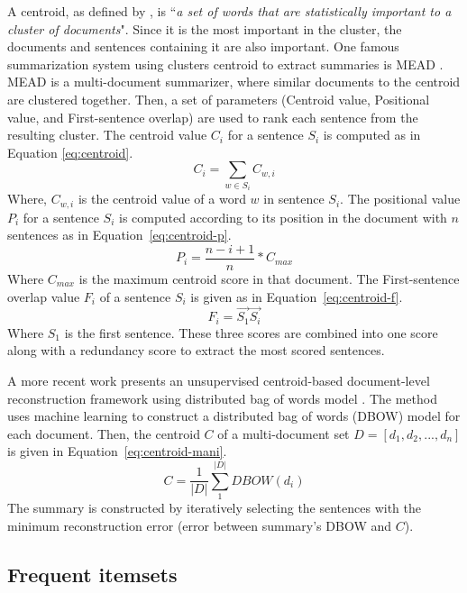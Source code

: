 A centroid, as defined by \citet{04-radev-al}, is ``\textit{a set of words that are statistically important to a cluster of documents}". 
Since it is the most important in the cluster, the documents and sentences containing it are also important.
One famous summarization system using clusters centroid to extract summaries is MEAD \citep{00-radev-al,04-radev-al}.
MEAD is a multi-document summarizer, where similar documents to the centroid are clustered together.
Then, a set of parameters (Centroid value, Positional value, and First-sentence overlap) are used to rank each sentence from the resulting cluster.
The centroid value $ C_i $ for a sentence $ S_i $ is computed as in Equation \ref{eq:centroid}.
\begin{equation}
\label{eq:centroid}
C_i = \sum_{w \in S_i}  C_{w,i}
\end{equation}
Where, $ C_{w,i} $ is the centroid value of a word $ w $ in sentence $ S_i $.
The positional value $ P_i $ for a sentence $ S_i $ is computed according to its position in the document with $ n $ sentences as in Equation~\ref{eq:centroid-p}.
\begin{equation}
\label{eq:centroid-p}
P_i = \frac{n - i + 1}{n} * C_{max}
\end{equation}
Where $ C_{max} $ is the maximum centroid score in that document.
The First-sentence overlap value $ F_i $ of a sentence $ S_i $ is given as in Equation~\ref{eq:centroid-f}.
\begin{equation}
\label{eq:centroid-f}
F_i = \overrightarrow{S_1} \overrightarrow{S_i}
\end{equation}
Where $ S_1 $ is the first sentence.
These three scores are combined into one score along with a redundancy score to extract the most scored sentences.

A more recent work presents an unsupervised centroid-based document-level reconstruction framework using distributed bag of words model \citep{18-mani-al}.
The method uses machine learning to construct a distributed bag of words (DBOW) model for each document. 
Then, the centroid $ C $ of a multi-document set $ D = [d_1, d_2, ..., d_n] $ is given in Equation~\ref{eq:centroid-mani}.
\begin{equation}
\label{eq:centroid-mani}
C = \frac{1}{|D|}\sum\limits_{1}^{|D|} DBOW(d_i)
\end{equation}
The summary is constructed by iteratively selecting the sentences with the minimum reconstruction error (error between summary's DBOW and $ C $).

\subsection{Frequent itemsets}

